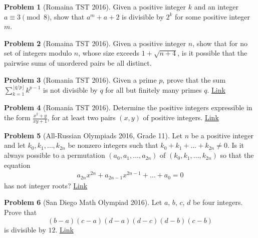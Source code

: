 \documentclass[]{article}
\theoremstyle{definition}
\newtheorem{problem}{Problem}
\begin{document}
\begin{problem}[Romaina TST 2016]
	Given a positive integer $k$ and an integer $a \equiv 3 \pmod 8$, show that $a^m + a + 2$ is divisible by $2^k$ for some positive integer $m$.
\end{problem}


\begin{problem}[Romaina TST 2016]
	Given a positive integer $n$, show that for no set of integers modulo $n$, whose size exceeds $1 + \sqrt{n + 4}$, is it possible that the pairwise sums of unordered pairs be all distinct.
\end{problem}



\begin{problem}[Romania TST 2016]
	Given a prime $p$, prove that the sum $\sum\limits_{k=1}^{\lfloor q/p \rfloor}{k^{p-1}}$ is not divisible by $q$ for all but finitely many primes $q$. \hfill \href{http://artofproblemsolving.com/community/c6h1251136p6445449}{Link}
\end{problem}



\begin{problem}[Romania TST 2016]
	Determine the positive integers expressible in the form $\frac{x^2+y}{xy+1}$, for at least two pairs $(x,y)$ of positive integers. \hfill \href{http://artofproblemsolving.com/community/c6h1251122p6445252}{Link}
\end{problem}




\begin{problem}[All-Russian Olympiads 2016, Grade 11]
	Let $n$ be a positive integer and let $k_0,k_1, \dots,k_{2n}$ be nonzero integers such that $k_0+k_1 +\dots+k_{2n}\neq 0$. Is it always possible to a permutation $(a_0,a_1,\dots,a_{2n})$ of $(k_0,k_1,\dots,k_{2n})$ so that the equation
	\begin{align*} a_{2n}x^{2n}+a_{2n-1}x^{2n-1}+\dots+a_0=0 \end{align*}has not integer roots? \hfill \href{http://artofproblemsolving.com/community/c6h1238101p6307084}{Link}
\end{problem}


\begin{problem}[San Diego Math Olympiad 2016]
	Let $a$, $b$, $c$, $d$ be four integers. Prove that $$\left(b-a\right)\left(c-a\right)\left(d-a\right)\left(d-c\right)\left(d-b\right)\left(c-b\right)$$is divisible by $12$. \hfill \href{http://artofproblemsolving.com/community/c6h1217917p6073408}{Link}
\end{problem}
\end{document}
